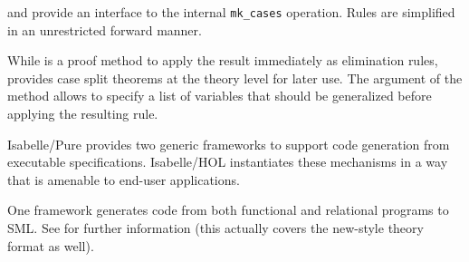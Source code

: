 \begin{isabellebody}
\begin{isamarkuptext}
\begin{descr}
  \item [\hyperlink{method.HOL.ind-cases}{\mbox{\isa{ind{\isacharunderscore}cases}}} and \hyperlink{command.HOL.inductive-cases}{\mbox{\isa{\isacommand{inductive{\isacharunderscore}cases}}}}] provide an interface to the internal \verb|mk_cases| operation.  Rules are simplified in an unrestricted
  forward manner.

  While \hyperlink{method.HOL.ind-cases}{\mbox{}} is a proof method to apply the
  result immediately as elimination rules, \hyperlink{command.HOL.inductive-cases}{\mbox{}} provides case split theorems at the theory level
  for later use.  The \hyperlink{keyword.for}{\mbox{}} argument of the \hyperlink{method.HOL.ind-cases}{\mbox{}} method allows to specify a list of variables that should
  be generalized before applying the resulting rule.

  \end{descr}%
\end{isamarkuptext}%
\isamarkuptrue%
%
\isamarkuptrue%
%
\begin{isamarkuptext}%
Isabelle/Pure provides two generic frameworks to support code
  generation from executable specifications.  Isabelle/HOL
  instantiates these mechanisms in a way that is amenable to end-user
  applications.

  One framework generates code from both functional and relational
  programs to SML.  See \cite{isabelle-HOL} for further information
  (this actually covers the new-style theory format as well).


\end{isamarkuptext}
\end{isabellebody}
